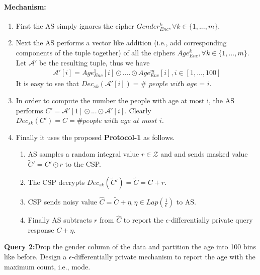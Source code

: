 \paragraph{Mechanism:} 
\begin{enumerate}\item First the AS simply ignores the cipher $Gender^k_{Enc}, \forall k \in \{1,...,m\}$. \item Next the AS performs a vector like addition (i.e., add corresponding components of the tuple together) of all the ciphers $Age^k_{Enc}, \forall k \in \{1,...,m\}$. Let $\mathcal{A}'$ be the resulting tuple, thus we have \begin{gather}\mathcal{A}'[i]=Age^1_{Enc}[i]\odot....\odot Age_{Enc}^m[i], i \in [1,...,100] \label{A}\end{gather} It is easy to see that $Dec_{sk}(\mathcal{A}'[i]) = \# \textit{ people with age = i}$.
\item In order to compute the number the people with age at most i, the AS performs $C'=\mathcal{A}'[1]\odot ...\odot \mathcal{A}'[i]$. Clearly $Dec_{sk}(C')=C=\#\textit{people with age at most i}$. \item Finally it uses the proposed \textbf{Protocol-1} as follows.\begin{enumerate}\item AS samples a random integral value $r \in \mathcal{Z}$ and and sends masked value $\tilde{C}'=C'\odot r$  to the CSP. \item The CSP decrypts $Dec_{sk}(\tilde{C}')=\tilde{C}=C+r$.  \item CSP sends noisy value $\hat{C}=\tilde{C}+\eta, \eta \in Lap(\frac{1}{\epsilon})$ to AS.  \item Finally AS subtracts $r$ from $\hat{C}$ to report the $\epsilon$-differentially private query response $C+\eta$.  \end{enumerate} \end{enumerate}
\textbf{Query 2:}Drop the gender column of the data and partition the age into 100 bins like before. Design a $\epsilon$-differentially private mechanism to report the age with the maximum count, i.e., mode.
